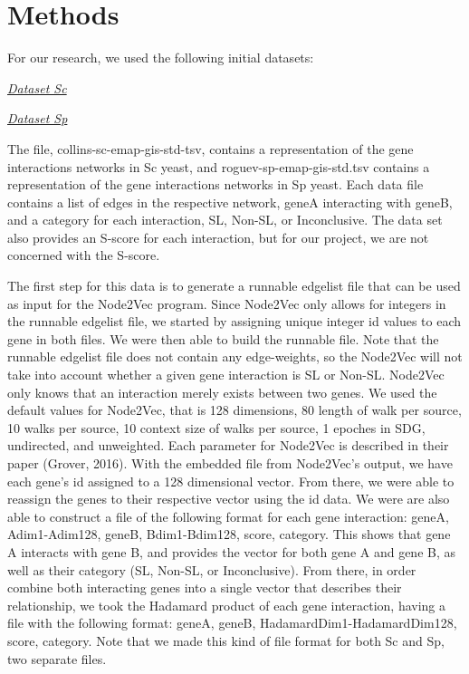 \section{Methods}
\label{sec:methods}
For our research, we used the following initial datasets: 

\href{https://obj.umiacs.umd.edu/lrgr/ppi-gi-data/gi/collins/sc/collins-sc-emap-gis-std.tsv
}{\textit{Dataset Sc}}

\href{https://obj.umiacs.umd.edu/lrgr/ppi-gi-data/gi/roguev/sp/roguev-sp-emap-gis-std.tsv
}{\textit{Dataset Sp}}


The file, collins-sc-emap-gis-std-tsv, contains a representation of the gene interactions networks in Sc yeast, and roguev-sp-emap-gis-std.tsv contains a representation of the gene interactions networks in Sp yeast. Each data file contains a list of edges in the respective network, geneA interacting with geneB, and a category for each interaction, SL, Non-SL, or Inconclusive. The data set also provides an S-score for each interaction, but for our project, we are not concerned with the S-score.

The first step for this data is to generate a runnable edgelist file that can be used as input for the Node2Vec program. Since Node2Vec only allows for integers in the runnable edgelist file, we started by assigning unique integer id values to each gene in both files. We were then able to build the runnable file. Note that the runnable edgelist file does not contain any edge-weights, so the Node2Vec will not take into account whether a given gene interaction is SL or Non-SL. Node2Vec only knows that an interaction merely exists between two genes. We used the default values for Node2Vec, that is 128 dimensions, 80 length of walk per source, 10 walks per source, 10 context size of walks per source, 1 epoches in SDG, undirected, and unweighted. Each parameter for Node2Vec is described in their paper (Grover, 2016). With the embedded file from Node2Vec’s output, we have each gene’s id assigned to a 128 dimensional vector. From there, we were able to reassign the genes to their respective vector using the id data. We were are also able to construct a file of the following format for each gene interaction: geneA, Adim1-Adim128, geneB, Bdim1-Bdim128, score, category. This shows that gene A interacts with gene B, and provides the vector for both gene A and gene B, as well as their category (SL, Non-SL, or Inconclusive). From there, in order combine both interacting genes into a single vector that describes their relationship, we took the Hadamard product of each gene interaction, having a file with the following format: geneA, geneB, HadamardDim1-HadamardDim128, score, category. Note that we made this kind of file format for both Sc and Sp, two separate files. 

